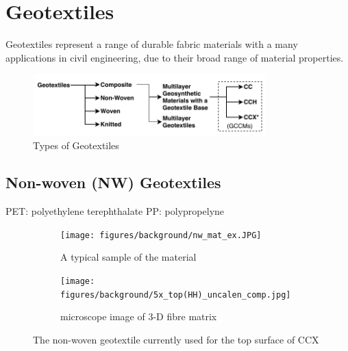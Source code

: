\documentclass[12pt]{report}
\newcommand{\tcr}[1]{\textcolor{darkRed}{#1}}
\newcommand{\tcb}[1]{\textcolor{darkBlue}{#1}}
\begin{document}
    
    
\section{Geotextiles}

Geotextiles represent a range of durable fabric materials with a many applications in civil engineering, due to their broad range of material properties. 

\begin{figure}
    \centering
    \includegraphics[width=0.8\textwidth]{figures/background/geotextiles_tree.pdf}
    \caption{Types of Geotextiles}
    \label{fig:geotextiles_tree}
\end{figure}

    
    \subsection{Non-woven (NW) Geotextiles}
    PET: polyethylene terephthalate
    PP: polypropelyne 
    \begin{figure}[ht]
    \begin{subfigure}{.5\textwidth}
        \centering
        \texttt{[image: figures/background/nw\_mat\_ex.JPG]}  
        \caption{A typical sample of the material}
        \label{fig:non_woven_example_roll}
    \end{subfigure}
    \begin{subfigure}{.5\textwidth}
        \centering
        \texttt{[image: figures/background/5x\_top(HH)\_uncalen\_comp.jpg]}  
        \caption{microscope image of 3-D fibre matrix}
        \label{fig:non_woven_top_microscope}
    \end{subfigure}
    \caption{The non-woven geotextile currently used for the top surface of CCX}
    \label{fig:non_woven_example}
    \end{figure}
    
\end{document}
